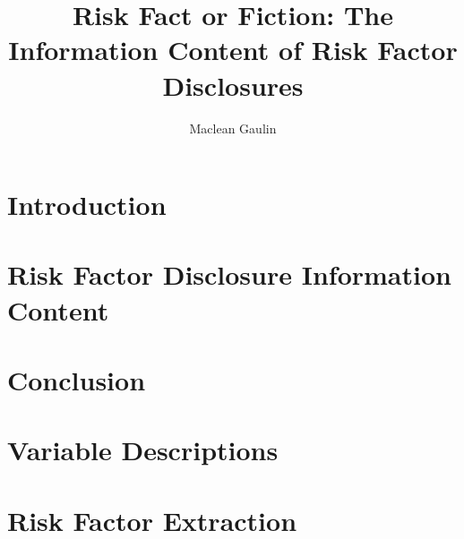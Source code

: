 \documentclass[12pt]{ruthesis}
\title{Risk Fact or Fiction: The Information Content of Risk Factor Disclosures}
\author{Maclean Gaulin}
\begin{document}
\begin{frontmatter}
    \makecover
    \maketitle
    
    
    \tableofcontents
    \listoffigures
    \listoftables
\end{frontmatter}





\chapter{Introduction} \label{ch:introduction}
    

\chapter{Risk Factor Disclosure Information Content} \label{ch:supply}
    

\chapter{Conclusion} \label{ch:conclusion}
    


\clearpage
{}
{} \label{ch:bibliography}
	{\singlespacing
		
		
	}


\clearpage
\appendix
{}
{}

\chapter{Variable Descriptions} \label{App:vardef}
    

\chapter{Risk Factor Extraction} \label{App:scraping}
    
\end{document}
